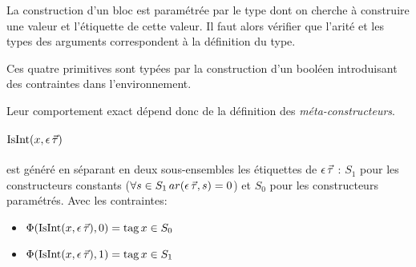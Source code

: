 \begin{mathpar}
\end{mathpar}
%
La construction d'un bloc est paramétrée par le type dont on cherche à
construire une valeur et l'étiquette de cette valeur. Il faut alors vérifier que
l'arité et les types des arguments correspondent à la définition du type.

\begin{mathpar}



\end{mathpar}
%
Ces quatre primitives sont typées par la construction d'un booléen
introduisant des contraintes dans l'environnement.

Leur comportement exact dépend donc de la définition des \emph{méta-constructeurs}.

\label{metaconstr}
\paragraph{$\kw{IsInt}(x,{\dtype})$} est généré en séparant en deux
sous-ensembles les étiquettes de $\dtype$ : $S_1$ pour les constructeurs
constants ($\forall s \in S_1 \, ar(\dtype,s) = 0$) et $S_0$ pour les
constructeurs paramétrés.  Avec les contraintes: 
\begin{itemize}
  \item $\Phi(\kw{IsInt}(x,{\dtype}),0) = \kw{tag} \var \in S_0$
  \item $\Phi(\kw{IsInt}(x,{\dtype}),1) = \kw{tag} \var \in S_1$
\end{itemize}

